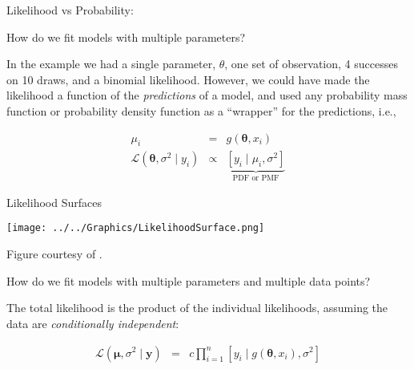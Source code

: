 \documentclass[ignorenonframetext,]{beamer}
\begin{document}
\begin{frame}{Likelihood vs Probability:}

\begin{center}

\end{center}

\end{frame}

\begin{frame}{How do we fit models with multiple parameters?}

In the example we had a single parameter, \(\theta\), one set of
observation, 4 successes on 10 draws, and a binomial likelihood.
However, we could have made the likelihood a function of the
\emph{predictions} of a model, and used any probability mass function or
probability density function as a ``wrapper'' for the predictions, i.e.,

\begin{eqnarray}
\mu_{i} & = & g(\bm{\theta}, x_{i})\nonumber\\
\mathscr{L}(\bm{\theta}, \sigma^{2} \mid y_{i}) & \propto & \underbrace{[y_{i} \mid \mu_{i},\sigma^{2}]}_{\text{PDF or PMF}}\nonumber
\end{eqnarray}

\end{frame}

\begin{frame}{Likelihood Surfaces}

\centerline{\texttt{[image: ../../Graphics/LikelihoodSurface.png]}}

\vspace*{1cm}

Figure courtesy of
\href{http://nesterko.com/lectures/stat221-2012/lecture8/\#/6}{}.

\end{frame}

\begin{frame}{How do we fit models with multiple parameters and multiple
data points?}

The total likelihood is the product of the individual likelihoods,
assuming the data are \emph{conditionally independent}:

\begin{eqnarray}
\mathscr{L}(\bm{\mu}, \sigma^{2} \mid \mathbf{y}) & = & c\prod_{i=1}^{n}[y_{i} \mid g(\bm{\theta}, x_{i}),\sigma^{2}]\nonumber
\end{eqnarray}

\end{frame}
\end{document}
